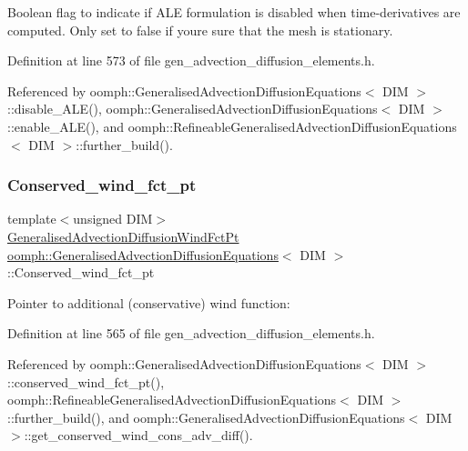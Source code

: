 Boolean flag to indicate if A\+LE formulation is disabled when time-\/derivatives are computed. Only set to false if you\textquotesingle{}re sure that the mesh is stationary. 



Definition at line 573 of file gen\+\_\+advection\+\_\+diffusion\+\_\+elements.\+h.



Referenced by oomph\+::\+Generalised\+Advection\+Diffusion\+Equations$<$ D\+I\+M $>$\+::disable\+\_\+\+A\+L\+E(), oomph\+::\+Generalised\+Advection\+Diffusion\+Equations$<$ D\+I\+M $>$\+::enable\+\_\+\+A\+L\+E(), and oomph\+::\+Refineable\+Generalised\+Advection\+Diffusion\+Equations$<$ D\+I\+M $>$\+::further\+\_\+build().

\mbox{\label{classoomph_1_1GeneralisedAdvectionDiffusionEquations_a56787086fb90a6af6e7e2e3e4e1e3a59}} 
\subsubsection{\texorpdfstring{Conserved\+\_\+wind\+\_\+fct\+\_\+pt}{Conserved\_wind\_fct\_pt}}
{\footnotesize\ttfamily template$<$unsigned D\+IM$>$ \\
\hyperlink{classoomph_1_1GeneralisedAdvectionDiffusionEquations_ac5a63eb03aee5957e7b14a4578423cfc}{Generalised\+Advection\+Diffusion\+Wind\+Fct\+Pt} \hyperlink{classoomph_1_1GeneralisedAdvectionDiffusionEquations}{oomph\+::\+Generalised\+Advection\+Diffusion\+Equations}$<$ D\+IM $>$\+::Conserved\+\_\+wind\+\_\+fct\+\_\+pt\hspace{0.3cm}{\ttfamily [protected]}}



Pointer to additional (conservative) wind function\+: 



Definition at line 565 of file gen\+\_\+advection\+\_\+diffusion\+\_\+elements.\+h.



Referenced by oomph\+::\+Generalised\+Advection\+Diffusion\+Equations$<$ D\+I\+M $>$\+::conserved\+\_\+wind\+\_\+fct\+\_\+pt(), oomph\+::\+Refineable\+Generalised\+Advection\+Diffusion\+Equations$<$ D\+I\+M $>$\+::further\+\_\+build(), and oomph\+::\+Generalised\+Advection\+Diffusion\+Equations$<$ D\+I\+M $>$\+::get\+\_\+conserved\+\_\+wind\+\_\+cons\+\_\+adv\+\_\+diff().

